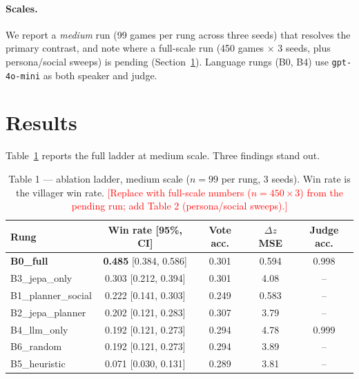 \documentclass[11pt]{article}
\newcommand{\note}[1]{\textcolor{red}{[#1]}}
\newcommand{\ci}[2]{{\footnotesize [#1, #2]}}
\newcommand{\num}[1]{#1}
\begin{document}
\paragraph{Scales.} We report a \emph{medium} run (99 games per rung across three
seeds) that resolves the primary contrast, and note where a full-scale run
(\num{450} games $\times$ 3 seeds, plus persona/social sweeps) is pending
(Section~\ref{sec:results}). Language rungs (B0, B4) use \texttt{gpt-4o-mini} as
both speaker and judge.

\section{Results}
\label{sec:results}
Table~\ref{tab:table1} reports the full ladder at medium scale. Three findings
stand out.

\begin{table}[t]
\centering
\small
\begin{tabular}{lcccc}
\toprule
Rung & Win rate \ci{95\%}{CI} & Vote acc. & $\Delta z$ MSE & Judge acc. \\
\midrule
\textbf{B0\_full}   & \textbf{0.485} \ci{0.384}{0.586} & 0.301 & 0.594 & 0.998 \\
B3\_jepa\_only      & 0.303 \ci{0.212}{0.394}          & 0.301 & 4.08  & --    \\
B1\_planner\_social & 0.222 \ci{0.141}{0.303}          & 0.249 & 0.583 & --    \\
B2\_jepa\_planner   & 0.202 \ci{0.121}{0.283}          & 0.307 & 3.79  & --    \\
B4\_llm\_only       & 0.192 \ci{0.121}{0.273}          & 0.294 & 4.78  & 0.999 \\
B6\_random          & 0.192 \ci{0.121}{0.273}          & 0.294 & 3.89  & --    \\
B5\_heuristic       & 0.071 \ci{0.030}{0.131}          & 0.289 & 3.81  & --    \\
\bottomrule
\end{tabular}
\caption{Table 1 --- ablation ladder, medium scale ($n=99$ per rung, 3 seeds).
Win rate is the villager win rate. \note{Replace with full-scale numbers
($n=450\times3$) from the pending run; add Table 2 (persona/social sweeps).}}
\label{tab:table1}
\end{table}
\end{document}
